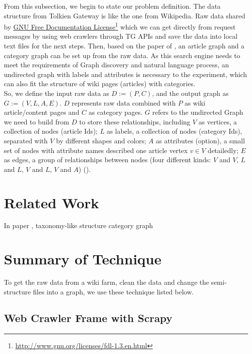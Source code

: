 From this subsection, we begin to state our problem definition. The data structure from Tolkien Gateway is like the one from Wikipedia. Raw data shared by \href{http://www.gnu.org/licenses/fdl-1.3.en.html}{GNU Free Documentation License}\footnote{\href{http://www.gnu.org/licenses/fdl-1.3.en.html}{http://www.gnu.org/licenses/fdl-1.3.en.html}} which we can get directly from request messages by using web crawlers through TG APIs and save the data into local text files for the next steps. Then, based on the paper of \cite{zesch2007analysis}, an article graph and a category graph can be set up from the raw data. 
As this search engine needs to meet the requirements of Graph discovery and natural language process, an undirected graph with labels and attributes is necessary to the experiment, which can also fit the structure of wiki pages (articles) with categories. \\
So, we define the input raw data as $D := (P, C)$, and the output graph as $G := (V, L, A, E)$. $D$ represents raw data combined with $P$ as wiki article/content pages and $C$ as category pages. $G$ refers to the undirected Graph we need to build from $D$ to store these relationships, including $V$ as vertices, a collection of nodes (article Ids); $L$ as labels, a collection of nodes (category Ids), separated with $V$ by different shapes and colors; $A$ as attributes (option), a small set of nodes with attribute names described one article vertex $v \in V$ detailedly; $E$ as edges, a group of relationships between nodes (four different kinds: $V$ and $V$, $L$ and $L$, $V$ and $L$, $V$ and $A$) (\cite{newman2003structure}). 

\section{Related Work}
\label{Ch-2:Sec:Related Work}
In paper \cite{zesch2007analysis}, taxonomy-like structure category graph

\section{Summary of Technique}
\label{Ch-2:Sec:Summary of Technique}

To get the raw data from a wiki farm, clean the data and change the semi-structure files into a graph, we use these technique listed below.

\subsection{Web Crawler Frame with Scrapy}

